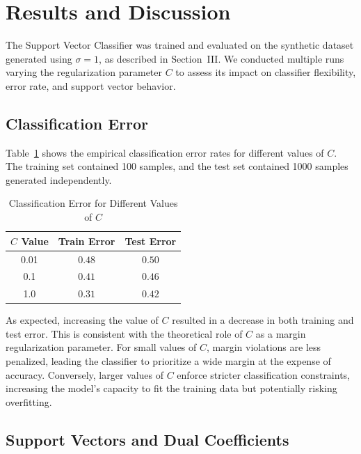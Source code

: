 \documentclass[conference]{IEEEtran}
\begin{document}
	
	\section{Results and Discussion}
	
	The Support Vector Classifier was trained and evaluated on the synthetic dataset generated using $\sigma = 1$, as described in Section~III. We conducted multiple runs varying the regularization parameter $C$ to assess its impact on classifier flexibility, error rate, and support vector behavior.
	
	\subsection{Classification Error}
	
	Table~\ref{results_table} shows the empirical classification error rates for different values of $C$. The training set contained 100 samples, and the test set contained 1000 samples generated independently.
	
	\begin{table}[htbp]
		\caption{Classification Error for Different Values of $C$}
		\begin{center}
			\begin{tabular}{|c|c|c|}
				\hline
				\textbf{$C$ Value} & \textbf{Train Error} & \textbf{Test Error} \\
				\hline
				0.01 & $0.48$ & $0.50$ \\
				\hline
				0.1 & $0.41$ & $0.46$ \\
				\hline
				1.0 & $0.31$ & $0.42$ \\
				\hline
			\end{tabular}
			\label{results_table}
		\end{center}
	\end{table}
	
	As expected, increasing the value of $C$ resulted in a decrease in both training and test error. This is consistent with the theoretical role of $C$ as a margin regularization parameter. For small values of $C$, margin violations are less penalized, leading the classifier to prioritize a wide margin at the expense of accuracy. Conversely, larger values of $C$ enforce stricter classification constraints, increasing the model’s capacity to fit the training data but potentially risking overfitting.
	
	\subsection{Support Vectors and Dual Coefficients}
	
\end{document}
